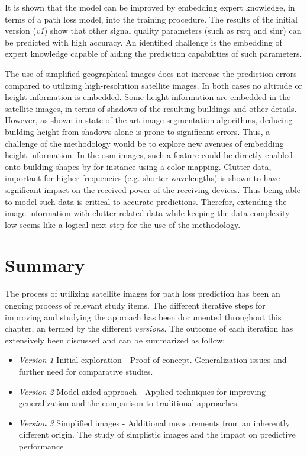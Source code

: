 It is shown that the model can be improved by embedding expert knowledge, in terms of a path loss model, into the training procedure. The results of the initial version (\emph{v1}) show that other signal quality parameters (such as \gls{rsrq} and \gls{sinr}) can be predicted with high accuracy. An identified challenge is the embedding of expert knowledge capable of aiding the prediction capabilities of such parameters. 

The use of simplified geographical images does not increase the prediction errors compared to utilizing high-resolution satellite images. In both cases no altitude or height information is embedded. Some height information are embedded in the satellite images, in terms of shadows of the resulting buildings and other details. However, as shown in state-of-the-art image segmentation algorithms, deducing building height from shadows alone is prone to significant errors. Thus, a challenge of the methodology would be to explore new avenues of embedding height information. In the \gls{osm} images, such a feature could be directly enabled onto building shapes by for instance using a color-mapping. Clutter data, important for higher frequencies (e.g. shorter wavelengths) is shown to have significant impact on the received power of the receiving devices. Thus being able to model such data is critical to accurate predictions. Therefor, extending the image information with clutter related data while keeping the data complexity low seems like a logical next step for the use of the methodology.


\section{Summary}\label{sec:satellite_image_discussion}
The process of utilizing satellite images for path loss prediction has been an ongoing process of relevant study items. The different iterative steps for improving and studying the approach has been documented throughout this chapter, an termed by the different \emph{versions}. The outcome of each iteration has extensively been discussed and can be summarized as follow:
\begin{itemize}
    \item \emph{Version 1} Initial exploration - Proof of concept. Generalization issues and further need for comparative studies.
    \item \emph{Version 2} Model-aided approach - Applied techniques for improving generalization and the comparison to traditional approaches.
    \item \emph{Version 3} Simplified images - Additional measurements from an inherently different origin. The study of simplistic images and the impact on predictive performance
\end{itemize}

